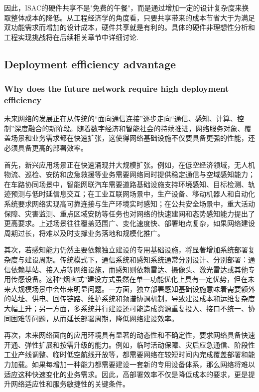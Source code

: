 因此，ISAC的硬件共享不是"免费的午餐"，而是通过增加一定的设计复杂度来换取整体成本的降低。从工程经济学的角度看，只要共享带来的成本节省大于为满足双功能需求而增加的设计成本，硬件共享就是有利的。具体的硬件非理想性分析和工程实现挑战将在后续相关章节中详细讨论.

\subsection{Deployment efficiency advantage}
\label{subsec:ch1-isac-core value-deployment}
\subsubsection{Why does the future network require high deployment efficiency}
\label{subsubsec:ch1-isac-core value-deployment-why}

未来网络的发展正在从传统的“面向通信连接”逐步走向“通信、感知、计算、控制”深度融合的新阶段。随着数字经济和智能社会的持续推进，网络服务对象、覆盖场景和业务需求都在快速扩张，这使得网络基础设施不仅要具备更强的性能，还必须具备更高的部署效率。

首先，新兴应用场景正在快速涌现并大规模扩张。例如，在低空经济领域，无人机物流、巡检、安防和应急救援等业务需要网络同时提供稳定通信与空域感知能力；在车路协同场景中，智能网联汽车需要道路基础设施支持环境感知、目标检测、轨迹预测与低时延信息交互；在工业互联网场景中，生产设备、移动机器人和自动化系统要求网络实现高可靠连接与生产环境实时感知；在公共安全场景中，重大活动保障、灾害监测、重点区域安防等任务也对网络的快速建网和态势感知能力提出了更高要求。上述场景往往覆盖范围广、变化速度快、部署地点复杂，如果网络建设周期过长，将难以及时支撑业务落地和规模化推广。

其次，若感知能力仍然主要依赖独立建设的专用基础设施，将显著增加系统部署复杂度与建设周期。传统模式下，通信系统和感知系统通常分别设计、分别部署：通信依赖基站、接入点等网络设施，而感知则依赖雷达、摄像头、激光雷达或其他专用传感设备。这种“烟囱式”建设方式虽然在单一功能优化上具有一定优势，但在未来大规模场景中会带来明显问题。一方面，独立部署感知基础设施意味着需要额外的站址、供电、回传链路、维护系统和频谱协调机制，导致建设成本和运维复杂度大幅上升；另一方面，多系统并行建设还可能造成资源重复投入、接口不统一、协同困难等问题，从而延长部署周期，降低网络建设效率。

再次，未来网络面向的应用环境具有显著的动态性和不确定性，要求网络具备快速开通、弹性扩展和按需升级的能力。例如，临时活动保障、灾后应急通信、阶段性工业产线调整、临时低空航线开放等，都需要网络在较短时间内完成覆盖部署和能力加载。如果每增加一种能力都需要建设一套新的专用设备体系，那么网络将难以适应这种快速变化的业务需求。因此，高部署效率不仅是降低成本的要求，更是提升网络适应性和服务敏捷性的关键条件。

